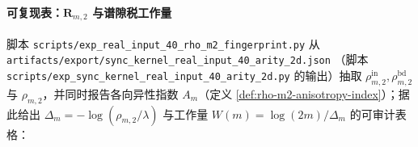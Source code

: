 \paragraph{可复现表：\texorpdfstring{$\mathbf{R}_{m,2}$}{R(m,2)} 与谱隙税工作量}
脚本 \texttt{scripts/exp\_real\_input\_40\_rho\_m2\_fingerprint.py} 从
\texttt{artifacts/export/sync\_kernel\_real\_input\_40\_arity\_2d.json}
（脚本 \texttt{scripts/exp\_sync\_kernel\_real\_input\_40\_arity\_2d.py} 的输出）抽取
\(\rho^{\mathrm{in}}_{m,2},\rho^{\mathrm{bd}}_{m,2}\) 与 \(\rho_{m,2}\)，并同时报告各向异性指数 \(A_m\)（定义 \ref{def:rho-m2-anisotropy-index}）；据此给出
\(\Delta_m=-\log(\rho_{m,2}/\lambda)\) 与工作量 \(W(m)=\log(2m)/\Delta_m\) 的可审计表格：


